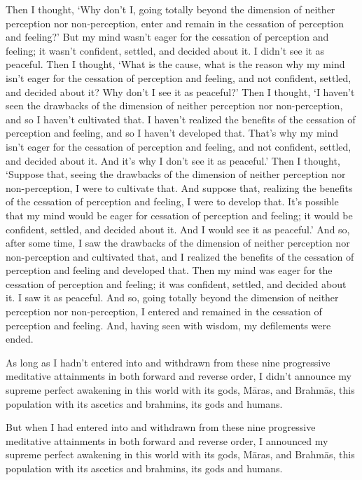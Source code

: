 \documentclass[12pt,openany]{book}%
\begin{document}
Then I thought, ‘Why don’t I, going totally beyond the dimension of neither perception nor non-perception, enter and remain in the cessation of perception and feeling?’ But my mind wasn’t eager for the cessation of perception and feeling; it wasn’t confident, settled, and decided about it. I didn’t see it as peaceful. Then I thought, ‘What is the cause, what is the reason why my mind isn’t eager for the cessation of perception and feeling, and not confident, settled, and decided about it? Why don’t I see it as peaceful?’ Then I thought, ‘I haven’t seen the drawbacks of the dimension of neither perception nor non-perception, and so I haven’t cultivated that. I haven’t realized the benefits of the cessation of perception and feeling, and so I haven’t developed that. That’s why my mind isn’t eager for the cessation of perception and feeling, and not confident, settled, and decided about it. And it’s why I don’t see it as peaceful.’ Then I thought, ‘Suppose that, seeing the drawbacks of the dimension of neither perception nor non-perception, I were to cultivate that. And suppose that, realizing the benefits of the cessation of perception and feeling, I were to develop that. It’s possible that my mind would be eager for cessation of perception and feeling; it would be confident, settled, and decided about it. And I would see it as peaceful.’ And so, after some time, I saw the drawbacks of the dimension of neither perception nor non-perception and cultivated that, and I realized the benefits of the cessation of perception and feeling and developed that. Then my mind was eager for the cessation of perception and feeling; it was confident, settled, and decided about it. I saw it as peaceful. And so, going totally beyond the dimension of neither perception nor non-perception, I entered and remained in the cessation of perception and feeling. And, having seen with wisdom, my defilements were ended. 

As long as I hadn’t entered into and withdrawn from these nine progressive meditative attainments in both forward and reverse order, I didn’t announce my supreme perfect awakening in this world with its gods, \textsanskrit{Māras}, and \textsanskrit{Brahmās}, this population with its ascetics and brahmins, its gods and humans. 

But when I had entered into and withdrawn from these nine progressive meditative attainments in both forward and reverse order, I announced my supreme perfect awakening in this world with its gods, \textsanskrit{Māras}, and \textsanskrit{Brahmās}, this population with its ascetics and brahmins, its gods and humans. 
\end{document}
